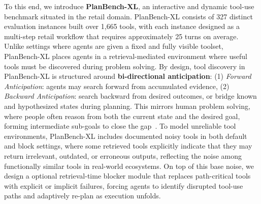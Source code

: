 \documentclass{llmxive}
\providecommand{\BENCH}[1]{\textbf{PlanBench-XL}}
\providecommand{\bench}[1]{PlanBench-XL}
\begin{document}

To this end, we introduce \BENCH{}, an interactive and dynamic tool-use benchmark situated in the retail domain. 
\bench{} consists of 327 distinct evaluation instances built over 1,665 tools, with each instance designed as a multi-step retail workflow that requires approximately 25 turns on average.
Unlike settings where agents are given a fixed and fully visible toolset, \bench{} places agents in a retrieval-mediated environment where useful tools must be discovered during problem solving.
By design, tool discovery in \bench{} is structured around \textbf{bi-directional anticipation}: (1) \textit{Forward Anticipation}: agents may search forward from accumulated evidence, (2) \textit{Backward Anticipation}: search backward from desired outcomes, or bridge known and hypothesized states during planning.
This mirrors human problem solving, where people often reason from both the current state and the desired goal, forming intermediate sub-goals to close the gap~\citep{newell1972human}.
To model unreliable tool environments, PlanBench-XL includes documented noisy tools in both default and block settings, where some retrieved tools explicitly indicate that they may return irrelevant, outdated, or erroneous outputs, reflecting the noise among functionally similar tools in real-world ecosystems.
On top of this base noise, we design a optional retrieval-time blocker module that replaces path-critical tools with explicit or implicit failures, forcing agents to identify disrupted tool-use paths and adaptively re-plan as execution unfolds.
\end{document}
